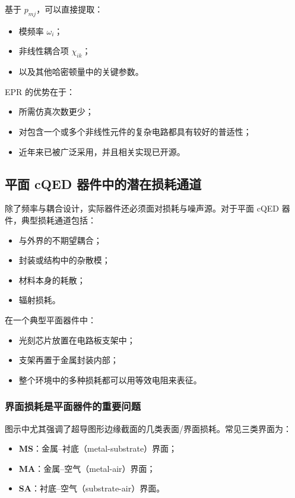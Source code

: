 \documentclass[12pt,a4paper,oneside]{ctexbook}
\begin{document}
基于 \(p_{mj}\)，可以直接提取：
\begin{itemize}
    \item 模频率 \(\omega_i\)；
    \item 非线性耦合项 \(\chi_{ik}\)；
    \item 以及其他哈密顿量中的关键参数。
\end{itemize}

EPR 的优势在于：
\begin{itemize}
    \item 所需仿真次数更少；
    \item 对包含一个或多个非线性元件的复杂电路都具有较好的普适性；
    \item 近年来已被广泛采用，并且相关实现已开源。
\end{itemize}

\subsection{平面 cQED 器件中的潜在损耗通道}

除了频率与耦合设计，实际器件还必须面对损耗与噪声源。对于平面 cQED 器件，典型损耗通道包括：

\begin{itemize}
    \item 与外界的不期望耦合；
    \item 封装或结构中的杂散模；
    \item 材料本身的耗散；
    \item 辐射损耗。
\end{itemize}

在一个典型平面器件中：
\begin{itemize}
    \item 光刻芯片放置在电路板支架中；
    \item 支架再置于金属封装内部；
    \item 整个环境中的多种损耗都可以用等效电阻来表征。
\end{itemize}

\subsubsection{界面损耗是平面器件的重要问题}

图示中尤其强调了超导图形边缘截面的几类表面/界面损耗。常见三类界面为：
\begin{itemize}
    \item \textbf{MS}：金属--衬底（metal-substrate）界面；
    \item \textbf{MA}：金属--空气（metal-air）界面；
    \item \textbf{SA}：衬底--空气（substrate-air）界面。
\end{itemize}
\end{document}
